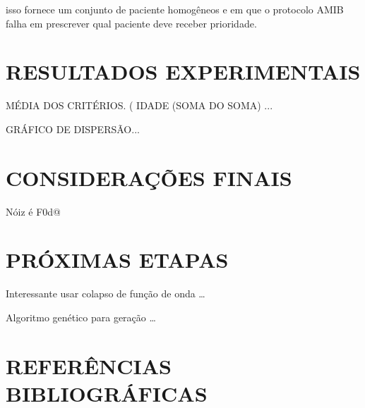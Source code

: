 \documentclass[12pt]{article}
\begin{document}
isso fornece um conjunto de paciente homogêneos e em que o protocolo AMIB falha em prescrever qual paciente deve receber prioridade. 


\section{RESULTADOS EXPERIMENTAIS}


MÉDIA DOS CRITÉRIOS. ( IDADE (SOMA DO SOMA) ...

GRÁFICO DE DISPERSÃO...





\section{CONSIDERAÇÕES FINAIS}

Nóiz é F0d@

\section{PRÓXIMAS ETAPAS}

Interessante usar colapso de função de onda \ldots

Algoritmo genético para geração \ldots


\section{REFERÊNCIAS BIBLIOGRÁFICAS}



\end{document}
